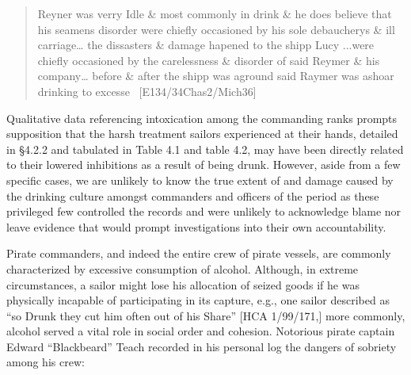 \begin{quotation}
Reyner was verry Idle \& most commonly in drink \& he does believe that his seamens disorder were chiefly occasioned by his sole debaucherys \& ill carriage… the dissasters \& damage hapened to the shipp Lucy ...were chiefly occasioned by the carelessness \& disorder of said Reymer \& his company… before \& after the shipp was aground said Raymer was ashoar drinking to excesse \ [E134/34Chas2/Mich36]

\end{quotation}
\begin{styleStandard}
Qualitative data referencing intoxication among the commanding ranks prompts supposition that the harsh treatment sailors experienced at their hands, detailed in §4.2.2 and tabulated in Table 4.1 and table 4.2, may have been directly related to their lowered inhibitions as a result of being drunk. However, aside from a few specific cases, we are unlikely to know the true extent of and damage caused by the drinking culture amongst commanders and officers of the period as these privileged few controlled the records and were unlikely to acknowledge blame nor leave evidence that would prompt investigations into their own accountability.
\end{styleStandard}


\begin{styleStandard}
Pirate commanders, and indeed the entire crew of pirate vessels, are commonly characterized by excessive consumption of alcohol. Although, in extreme circumstances, a sailor might lose his allocation of seized goods if he was physically incapable of participating in its capture, e.g., one sailor described as “so Drunk they cut him often out of his Share” [HCA 1/99/171,] more commonly, alcohol served a vital role in social order and cohesion. Notorious pirate captain Edward “Blackbeard” Teach recorded in his personal log the dangers of sobriety among his crew:
\end{styleStandard}


